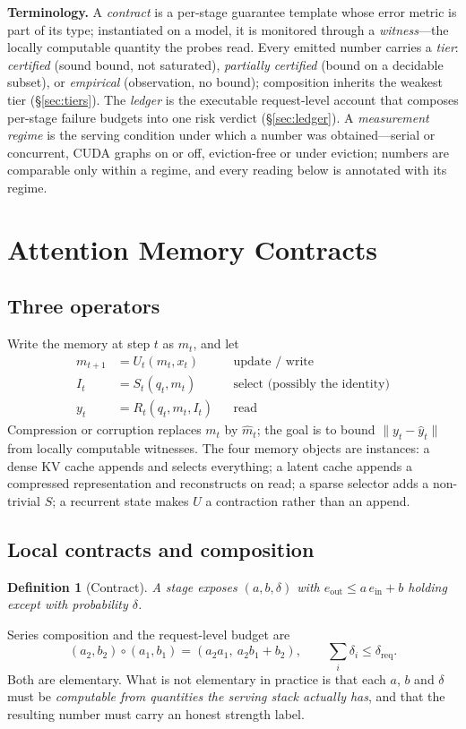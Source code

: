 \documentclass[11pt]{article}
\newtheorem{definition}{Definition}
\begin{document}
\textbf{Terminology.} A \emph{contract} is a per-stage guarantee template whose
error metric is part of its type; instantiated on a model, it is monitored
through a \emph{witness}---the locally computable quantity the probes read.
Every emitted number carries a \emph{tier}: \emph{certified} (sound bound, not
saturated), \emph{partially certified} (bound on a decidable subset), or
\emph{empirical} (observation, no bound); composition inherits the weakest tier
(\S\ref{sec:tiers}). The \emph{ledger} is the executable request-level account
that composes per-stage failure budgets into one risk verdict
(\S\ref{sec:ledger}). A \emph{measurement regime} is the serving condition under
which a number was obtained---serial or concurrent, CUDA graphs on or off,
eviction-free or under eviction; numbers are comparable only within a regime,
and every reading below is annotated with its regime.



\section{Attention Memory Contracts}
\label{sec:contract}

\subsection{Three operators}
Write the memory at step $t$ as $m_t$, and let
\begin{align}
m_{t+1} &= U_t(m_t, x_t) && \text{update / write}\\
I_t     &= S_t(q_t, m_t)  && \text{select (possibly the identity)}\\
y_t     &= R_t(q_t, m_t, I_t) && \text{read}
\end{align}
Compression or corruption replaces $m_t$ by $\hat m_t$; the goal is to bound
$\lVert y_t-\hat y_t\rVert$ from locally computable witnesses. The four memory
objects are instances: a dense KV cache appends and selects everything; a latent
cache appends a compressed representation and reconstructs on read; a sparse
selector adds a non-trivial $S$; a recurrent state makes $U$ a contraction rather
than an append.

\subsection{Local contracts and composition}
\begin{definition}[Contract]
A stage exposes $(a,b,\delta)$ with $e_{\mathrm{out}}\le a\,e_{\mathrm{in}}+b$
holding except with probability $\delta$.
\end{definition}
Series composition and the request-level budget are
\begin{equation}
(a_2,b_2)\circ(a_1,b_1)=(a_2a_1,\ a_2b_1+b_2),
\qquad
\textstyle\sum_i\delta_i\le\delta_{\mathrm{req}} .
\label{eq:compose}
\end{equation}
Both are elementary. What is not elementary in practice is that each $a$, $b$ and
$\delta$ must be \emph{computable from quantities the serving stack actually has},
and that the resulting number must carry an honest strength label.
\end{document}
